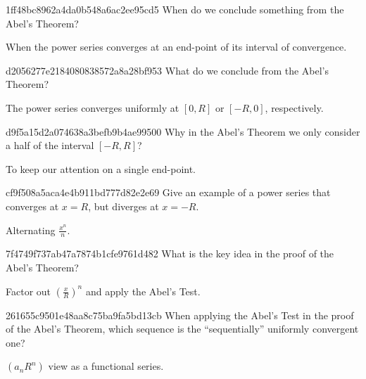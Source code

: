 \begin{note}{1ff48bc8962a4da0b548a6ac2ee95cd5}
    When do we conclude something from the Abel's Theorem?

    \begin{cloze}{1}
        When the power series converges at an end-point of its interval of convergence.
    \end{cloze}
\end{note}

\begin{note}{d2056277e2184080838572a8a28bf953}
    What do we conclude from the Abel's Theorem?

    \begin{cloze}{1}
        The power series converges uniformly at \({ [0, R] }\) or \({ [-R, 0] }\), respectively.
    \end{cloze}
\end{note}

\begin{note}{d9f5a15d2a074638a3befb9b4ae99500}
    Why in the Abel's Theorem we only consider a half of the interval \({ [-R, R] }\)?

    \begin{cloze}{1}
        To keep our attention on a single end-point.
    \end{cloze}
\end{note}

\begin{note}{cf9f508a5aca4e4b911bd777d82e2e69}
    Give an example of a power series that converges at \({ x = R }\), but diverges at \({ x = -R }\).

    \begin{cloze}{1}
        Alternating \({ \frac{x^{n}}{n} }\).
    \end{cloze}
\end{note}

\begin{note}{7f4749f737ab47a7874b1cfe9761d482}
    What is the key idea in the proof of the Abel's Theorem?

    \begin{cloze}{1}
        Factor out \({ \left( \frac{x}{R} \right)^{n} }\) and apply the Abel's Test.
    \end{cloze}
\end{note}

\begin{note}{261655c9501e48aa8c75ba9fa5bd13cb}
    When applying the Abel's Test in the proof of the Abel's Theorem, which sequence is the ``sequentially'' uniformly convergent one?

    \begin{cloze}{1}
        \({ \left( a_n R^{n} \right) }\) view as a functional series.
    \end{cloze}
\end{note}

